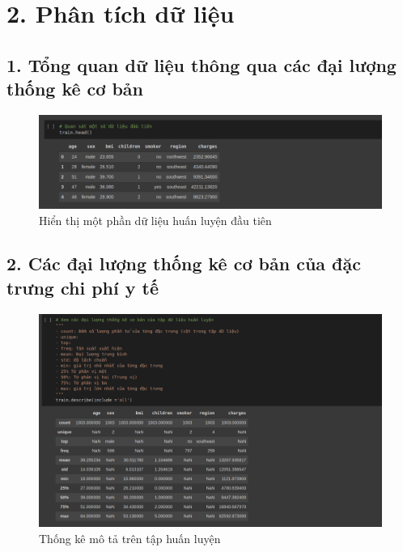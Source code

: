 \documentclass{article}
\begin{document}
	\section{2. Phân tích dữ liệu}
	
	\subsection{1. Tổng quan dữ liệu thông qua các đại lượng thống kê cơ bản}
	\begin{figure}[H]
		\centering
		\includegraphics[width=1\textwidth]{images/train_head.png}
		\caption{Hiển thị một phần dữ liệu huấn luyện đầu tiên}
		\label{fig:writing-thesis-train-head}
	\end{figure}
	
	\subsection{2. Các đại lượng thống kê cơ bản của đặc trưng chi phí y tế}
	\begin{figure}[H]
		\centering
		\includegraphics[width=1\textwidth]{images/simple_stat_on_train_set.png}
		\caption{Thống kê mô tả trên tập huấn luyện}
		\label{fig:writing-thesis-simple-stat-on-train-set}
	\end{figure}
\end{document}
